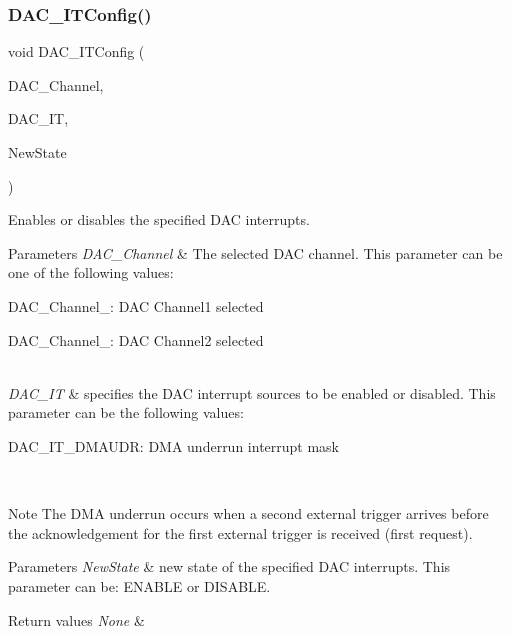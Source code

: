 \subsubsection{D\+A\+C\+\_\+\+I\+T\+Config()}
{\footnotesize\ttfamily void D\+A\+C\+\_\+\+I\+T\+Config (\begin{DoxyParamCaption}\item[{uint32\+\_\+t}]{D\+A\+C\+\_\+\+Channel,  }\item[{uint32\+\_\+t}]{D\+A\+C\+\_\+\+IT,  }\item[{\textbf{ Functional\+State}}]{New\+State }\end{DoxyParamCaption})}



Enables or disables the specified D\+AC interrupts. 


\begin{DoxyParams}{Parameters}
{\em D\+A\+C\+\_\+\+Channel} & The selected D\+AC channel. This parameter can be one of the following values\+: \begin{DoxyItemize}
\item D\+A\+C\+\_\+\+Channel\+\_\+: D\+AC Channel1 selected \item D\+A\+C\+\_\+\+Channel\+\_\+: D\+AC Channel2 selected \end{DoxyItemize}
\\
\hline
{\em D\+A\+C\+\_\+\+IT} & specifies the D\+AC interrupt sources to be enabled or disabled. This parameter can be the following values\+: \begin{DoxyItemize}
\item D\+A\+C\+\_\+\+I\+T\+\_\+\+D\+M\+A\+U\+DR\+: D\+MA underrun interrupt mask \end{DoxyItemize}
\\
\hline
\end{DoxyParams}
\begin{DoxyNote}{Note}
The D\+MA underrun occurs when a second external trigger arrives before the acknowledgement for the first external trigger is received (first request). 
\end{DoxyNote}

\begin{DoxyParams}{Parameters}
{\em New\+State} & new state of the specified D\+AC interrupts. This parameter can be\+: E\+N\+A\+B\+LE or D\+I\+S\+A\+B\+LE. \\
\hline
\end{DoxyParams}

\begin{DoxyRetVals}{Return values}
{\em None} & \\
\hline
\end{DoxyRetVals}


